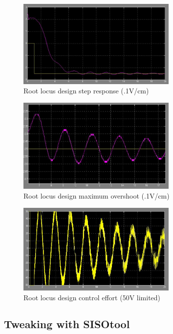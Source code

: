 \begin{figure}[h]
	\centering
		\includegraphics[width=0.70\textwidth]{pics/stepresponse}
	\caption{Root locus design step response (.1V/cm)}
	\label{3:fig:stepresponse}
\end{figure}

\begin{figure}[h]
	\centering
		\includegraphics[width=0.70\textwidth]{pics/maximumovershoot}
	\caption{Root locus design maximum overshoot (.1V/cm)}
	\label{3:fig:maximumovershoot}
\end{figure}

\begin{figure}[h]
	\centering
		\includegraphics[width=0.70\textwidth]{pics/controleffort}
	\caption{Root locus design control effort (50V limited)}
	\label{3:fig:controleffort}
\end{figure}

\pagebreak

\subsection{Tweaking with SISOtool}

